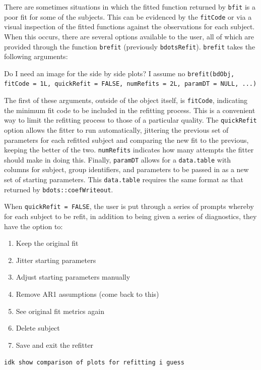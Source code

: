 \documentclass{article}
\begin{document}
There are sometimes situations in which the fitted function returned by \texttt{bfit} is a poor fit for some of the subjects. This can be evidenced by the \texttt{fitCode} or via a visual inspection of the fitted functions against the observations for each subject.  When this occurs, there are several options available to the user, all of which are provided through the function \texttt{brefit} (previously \texttt{bdotsRefit}). \texttt{brefit} takes the following arguments:

\begin{center}
Do I need an image for the side by side plots? I assume no
\texttt{brefit(bdObj, fitCode = 1L, quickRefit = FALSE, numRefits = 2L, paramDT = NULL, ...)}
\end{center}

The first of these arguments, outside of the object itself, is \texttt{fitCode}, indicating  the minimum fit code to be included in the refitting process. This is a convenient way to limit the refitting process to those of a particular quality. The \texttt{quickRefit} option allows the fitter to run automatically, jittering the previous set of parameters for each refitted subject and comparing the new fit to the previous, keeping the better of the two. \texttt{numRefits} indicates how many attempts the fitter should make in doing this. Finally, \texttt{paramDT} allows for a \texttt{data.table} with columns for subject, group identifiers, and parameters to be passed in as a new set of starting parameters. This \texttt{data.table} requires the same format as that returned by \texttt{bdots::coefWriteout}.

When \texttt{quickRefit = FALSE}, the user is put through a series of prompts whereby for each subject to be refit, in addition to being given a series of diagnostics, they have the option to:

\begin{enumerate}
\item Keep the original fit
\item Jitter starting parameters
\item Adjust starting parameters manually
\item Remove AR1 assumptions (come back to this)
\item See original fit metrics again
\item Delete subject
\item Save and exit the refitter
\end{enumerate}

\begin{center}
\texttt{idk show comparison of plots for refitting i guess}
\end{center}
\end{document}
